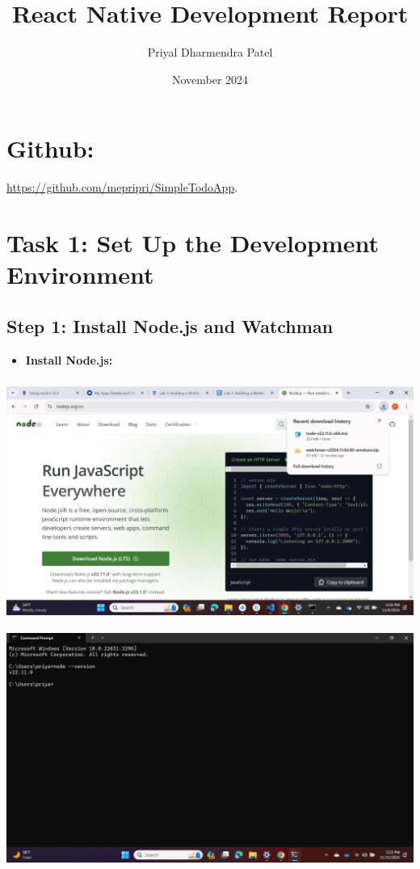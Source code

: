 \documentclass{article}
\title{React Native Development Report}
\author{Priyal Dharmendra Patel}
\date{November 2024}
\begin{document}
\maketitle

\section*{Github:}
\href{https://github.com/mepripri/SimpleTodoApp}{\uline{https://github.com/mepripri/SimpleTodoApp}}.


\section*{Task 1: Set Up the Development Environment}

\subsection*{Step 1: Install Node.js and Watchman}

\begin{itemize}
    \item \textbf{Install Node.js:}
\end{itemize}
\includegraphics[width=5.57813in,height=3.13391in]{media/image2.png}
\includegraphics[width=5.57813in,height=3.13391in]{media/image9.png}
    
\end{document}

